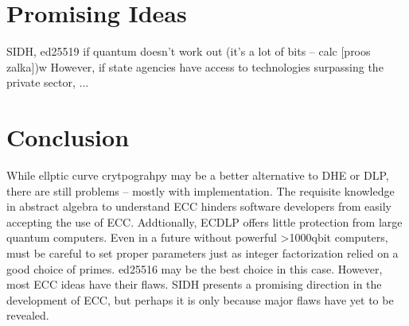 \documentclass{article}
\begin{document}
\section{Promising Ideas}
SIDH, ed25519 if quantum doesn't work out (it's a lot of bits -- calc [proos zalka])w
However, if state agencies have access to technologies surpassing the private sector,
...

\section{Conclusion}
While ellptic curve crytpograhpy may be a better alternative to DHE or DLP, 
there are still problems -- mostly with implementation. The requisite knowledge
in abstract algebra to understand ECC hinders software developers from easily
accepting the use of ECC. Addtionally, ECDLP offers little protection from 
large quantum computers. Even in a future without powerful >1000qbit computers,
must be careful to set proper parameters just as integer factorization relied
on a good choice of primes. ed25516 may be the best choice in this case. However,
most ECC ideas have their flaws. SIDH presents a promising direction in the
development of ECC, but perhaps it is only because major flaws have yet to be revealed.


\printbibliography
\end{document}
